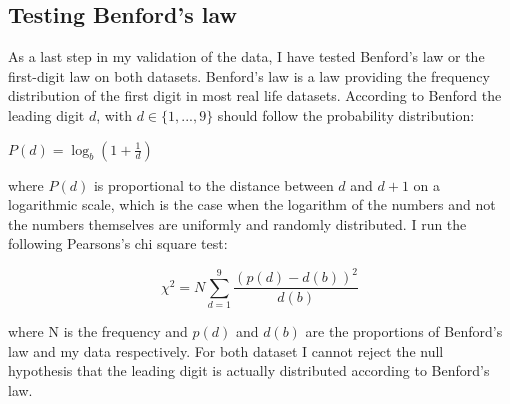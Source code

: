 \documentclass[12pt,a4paper,titlepage,english]{article}
\begin{document}
\subsection{Testing Benford’s law}
As a last step in my validation of the data, I have tested Benford’s law or the first-digit law on both datasets. Benford’s law is a law providing the frequency distribution of the first digit in most real life datasets. According to Benford the leading digit $d$, with $d \in \{1,...,9\}$ should follow the probability distribution: 
\begin{center}
$P(d)=\log_b(1+\frac{1}{d})$
\end{center}
where $P(d)$ is proportional to the distance between $d$ and $d+1$ on a logarithmic scale, which is the case when the logarithm of the numbers and not the numbers themselves are uniformly and randomly distributed. I run the following Pearsons’s chi square test:
\begin{center}
$$\chi^2=N\sum_{d=1}^{9}\frac{(p(d)-d(b))^2}{d(b)}$$
\end{center}
where N is the frequency and $p(d)$ and $d(b)$ are the proportions of Benford’s law and my data respectively. For both dataset I cannot reject the null hypothesis that the leading digit is actually distributed according to Benford’s law.
\end{document}
